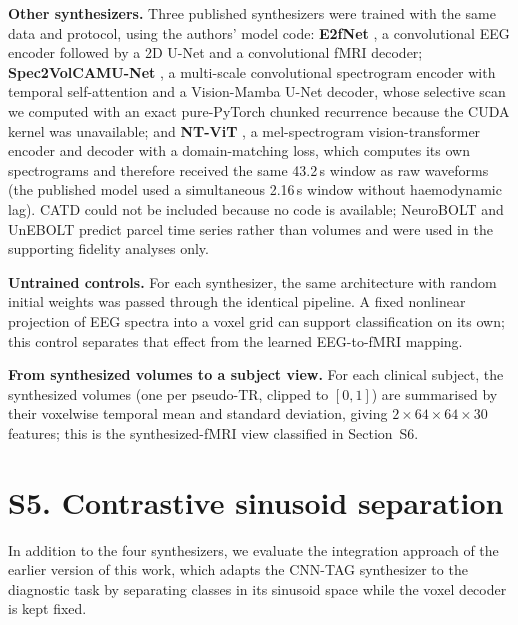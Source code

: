 \documentclass[10pt]{article}
\begin{document}
\noindent\textbf{Other synthesizers.} Three published synthesizers were trained with the same data and protocol, using the authors' model code: \textbf{E2fNet} \cite{roos2025brainwaves}, a convolutional EEG encoder followed by a 2D U-Net and a convolutional fMRI decoder; \textbf{Spec2VolCAMU-Net} \cite{he2025spec2vol}, a multi-scale convolutional spectrogram encoder with temporal self-attention and a Vision-Mamba U-Net decoder, whose selective scan we computed with an exact pure-PyTorch chunked recurrence because the CUDA kernel was unavailable; and \textbf{NT-ViT} \cite{lanzino2024ntvit}, a mel-spectrogram vision-transformer encoder and decoder with a domain-matching loss, which computes its own spectrograms and therefore received the same 43.2\,s window as raw waveforms (the published model used a simultaneous 2.16\,s window without haemodynamic lag). CATD \cite{yao2025catd} could not be included because no code is available; NeuroBOLT and UnEBOLT \cite{li2024neurobolt,li2026unebolt} predict parcel time series rather than volumes and were used in the supporting fidelity analyses only.

\noindent\textbf{Untrained controls.} For each synthesizer, the same architecture with random initial weights was passed through the identical pipeline. A fixed nonlinear projection of EEG spectra into a voxel grid can support classification on its own; this control separates that effect from the learned EEG-to-fMRI mapping.





\noindent\textbf{From synthesized volumes to a subject view.} For each clinical subject, the synthesized volumes (one per pseudo-TR, clipped to $[0,1]$) are summarised by their voxelwise temporal mean and standard deviation, giving $2\times64\times64\times30$ features; this is the synthesized-fMRI view classified in Section~S6.

\section*{S5. Contrastive sinusoid separation}

In addition to the four synthesizers, we evaluate the integration approach of the earlier version of this work, which adapts the CNN-TAG synthesizer to the diagnostic task by separating classes in its sinusoid space while the voxel decoder is kept fixed.
\end{document}
